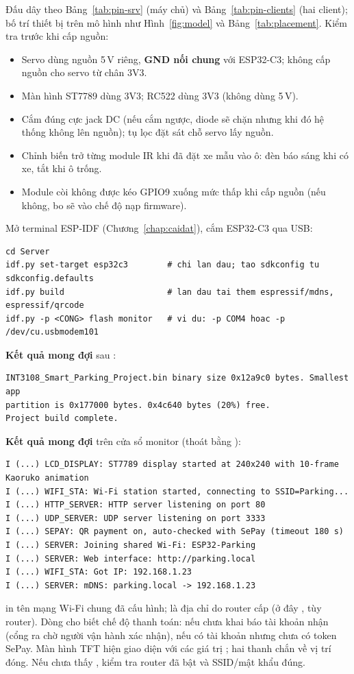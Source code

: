 Đấu dây theo Bảng~\ref{tab:pin-srv} (máy chủ) và Bảng~\ref{tab:pin-clients} (hai client);
bố trí thiết bị trên mô hình như Hình~\ref{fig:model} và Bảng~\ref{tab:placement}.
Kiểm tra trước khi cấp nguồn:
\begin{itemize}
  \item Servo dùng nguồn 5\,V riêng, \textbf{GND nối chung} với ESP32-C3; không cấp
        nguồn cho servo từ chân 3V3.
  \item Màn hình ST7789 dùng 3V3; RC522 dùng 3V3 (không dùng 5\,V).
  \item Cắm đúng cực jack DC (nếu cắm ngược, diode sẽ chặn nhưng khi đó hệ thống không lên nguồn);
        tụ lọc đặt sát chỗ servo lấy nguồn.
  \item Chỉnh biến trở từng module IR khi đã đặt xe mẫu vào ô: đèn báo sáng khi có xe,
        tắt khi ô trống.
  \item Module còi không được kéo GPIO9 xuống mức thấp khi cấp nguồn (nếu không, bo
        sẽ vào chế độ nạp firmware).
\end{itemize}

Mở terminal ESP-IDF (Chương~\ref{chap:caidat}), cắm ESP32-C3 qua USB:
\begin{lstlisting}[style=shell]
cd Server
idf.py set-target esp32c3        # chi lan dau; tao sdkconfig tu sdkconfig.defaults
idf.py build                     # lan dau tai them espressif/mdns, espressif/qrcode
idf.py -p <CONG> flash monitor   # vi du: -p COM4 hoac -p /dev/cu.usbmodem101
\end{lstlisting}
\textbf{Kết quả mong đợi} sau :
\begin{lstlisting}[language={},numbers=none]
INT3108_Smart_Parking_Project.bin binary size 0x12a9c0 bytes. Smallest app
partition is 0x177000 bytes. 0x4c640 bytes (20%) free.
Project build complete.
\end{lstlisting}
\textbf{Kết quả mong đợi} trên cửa sổ monitor (thoát bằng \code{Ctrl+]}):
\begin{lstlisting}[language={},numbers=none]
I (...) LCD_DISPLAY: ST7789 display started at 240x240 with 10-frame Kaoruko animation
I (...) WIFI_STA: Wi-Fi station started, connecting to SSID=Parking...
I (...) HTTP_SERVER: HTTP server listening on port 80
I (...) UDP_SERVER: UDP server listening on port 3333
I (...) SEPAY: QR payment on, auto-checked with SePay (timeout 180 s)
I (...) SERVER: Joining shared Wi-Fi: ESP32-Parking
I (...) SERVER: Web interface: http://parking.local
I (...) WIFI_STA: Got IP: 192.168.1.23
I (...) SERVER: mDNS: parking.local -> 192.168.1.23
\end{lstlisting}
 in tên mạng Wi-Fi chung đã cấu hình;  là địa chỉ
do router cấp (ở đây , tùy router). Dòng  cho biết chế độ
thanh toán:  nếu chưa khai báo tài khoản nhận (cổng ra chờ người vận hành xác nhận),
 nếu có tài khoản nhưng chưa có token SePay. Màn hình TFT
hiện giao diện  với các giá trị ; hai thanh chắn về vị trí
đóng. Nếu chưa thấy , kiểm tra router đã bật và SSID/mật khẩu đúng.

